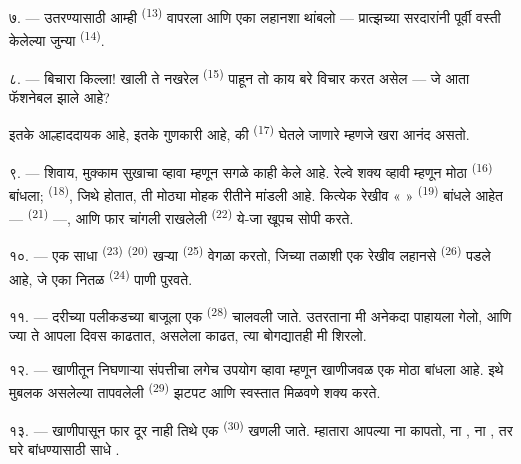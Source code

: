७. --- उतरण्यासाठी आम्ही  \textsuperscript{(13)} वापरला आणि एका लहानशा
 थांबलो — प्रात्झच्या सरदारांनी पूर्वी वस्ती केलेल्या जुन्या
  \textsuperscript{(14)}.

८. --- बिचारा किल्ला! खाली ते नखरेल  \textsuperscript{(15)} पाहून तो काय
बरे विचार करत असेल — जे आता फॅशनेबल  झाले आहे?

 इतके आल्हाददायक आहे,  इतके गुणकारी आहे, की  \textsuperscript{(17)} घेतले जाणारे  म्हणजे खरा आनंद असतो.

\VUsaut{3.0mm}
\VUsaut{3.0mm}

९. --- शिवाय, मुक्काम सुखाचा व्हावा म्हणून सगळे काही केले आहे. रेल्वे शक्य व्हावी म्हणून मोठा
 \textsuperscript{(16)} बांधला;  
\textsuperscript{(18)}, जिथे  होतात, ती मोठ्या मोहक रीतीने मांडली आहे. कित्येक
रेखीव «  » \textsuperscript{(19)} बांधले आहेत — 
\textsuperscript{(21)} —, आणि फार चांगली राखलेली  \textsuperscript{(22)} ये-जा
खूपच सोपी करते.

१०. --- एक साधा  \textsuperscript{(23)}  \textsuperscript{(20)}
खऱ्या  \textsuperscript{(25)} वेगळा करतो, जिच्या तळाशी एक रेखीव लहानसे
 \textsuperscript{(26)} पडले आहे, जे एका नितळ 
\textsuperscript{(24)} पाणी पुरवते.

११. --- दरीच्या पलीकडच्या बाजूला एक  \textsuperscript{(28)} चालवली जाते.
  उतरताना मी अनेकदा पाहायला गेलो, आणि ज्या
 ते आपला दिवस काढतात,  असलेला  काढत, त्या
बोगद्यातही मी शिरलो.

१२. --- खाणीतून निघणाऱ्या संपत्तीचा लगेच उपयोग व्हावा म्हणून खाणीजवळ एक मोठा
 बांधला आहे. इथे मुबलक असलेल्या  तापवलेली
 \textsuperscript{(29)} झटपट आणि स्वस्तात  मिळवणे शक्य करते.

१३. --- खाणीपासून फार दूर नाही तिथे एक  \textsuperscript{(30)} खणली जाते.
म्हातारा  आपल्या  ना  कापतो, ना
, ना , तर घरे बांधण्यासाठी साधे .

